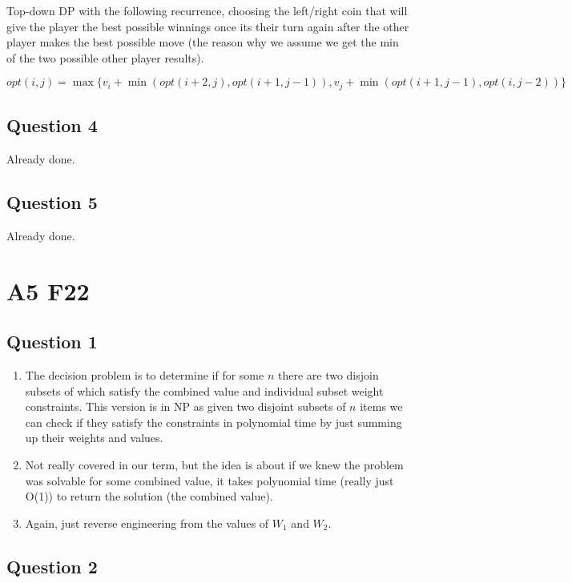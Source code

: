 \documentclass[11pt]{article}
\begin{document}
Top-down DP with the following recurrence, choosing the left/right coin that will give the player the best possible winnings once its their turn again after the other player makes the best possible move (the reason why we assume we get the min of the two possible other player results).

\[ opt(i, j) = \max \{ v_i + \min (opt(i + 2, j), opt(i + 1, j - 1)), v_j + \min(opt(i + 1, j - 1), opt(i, j - 2)) \} \]

\subsection{Question 4}

Already done.

\subsection{Question 5}

Already done.

\section{A5 F22}

\subsection{Question 1}

\begin{enumerate}
    \item The decision problem is to determine if for some $n$ there are two disjoin subsets of which satisfy the combined value and individual subset weight constraints. This version is in NP as given two disjoint subsets of $n$ items we can check if they satisfy the constraints in polynomial time by just summing up their weights and values.
    \item Not really covered in our term, but the idea is about if we knew the problem was solvable for some combined value, it takes polynomial time (really just O(1)) to return the solution (the combined value).
    \item Again, just reverse engineering from the values of $W_1$ and $W_2$.
\end{enumerate}

\subsection{Question 2}
\end{document}
